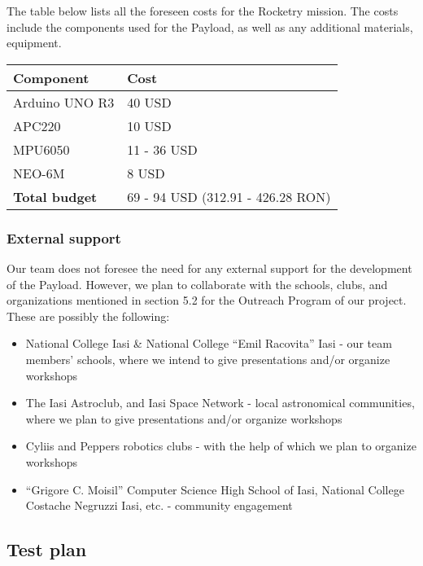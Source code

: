 The table below lists all the foreseen costs for the Rocketry mission. The costs include the components used for the Payload, as well as any additional materials, equipment.

\begin{table}[H]
\centering
\begin{tabularx}{\textwidth}{|X|X|}
\hline
\textbf{Component} & \textbf{Cost} \\ \hline
Arduino UNO R3 & 40 USD \\
APC220 & 10 USD \\
MPU6050 & 11 - 36 USD \\
NEO-6M & 8 USD \\ \hline
\textbf{Total budget} & 69 - 94 USD (312.91 - 426.28 RON) \\ \hline
\end{tabularx}
\end{table}

\subsubsection{External support}

Our team does not foresee the need for any external support for the development of the Payload. However, we plan to collaborate with the schools, clubs, and organizations mentioned in section 5.2 for the Outreach Program of our project. These are possibly the following:

\begin{itemize}

\item National College Iasi \& National College “Emil Racovita” Iasi - our team members' schools, where we intend to give presentations and/or organize workshops
\item The Iasi Astroclub, and Iasi Space Network - local astronomical communities, where we plan to give presentations and/or organize workshops
\item Cyliis and Peppers robotics clubs - with the help of which we plan to organize workshops
\item “Grigore C. Moisil” Computer Science High School of Iasi, National College Costache Negruzzi Iasi, etc. - community engagement

\end{itemize}

\subsection{Test plan}

